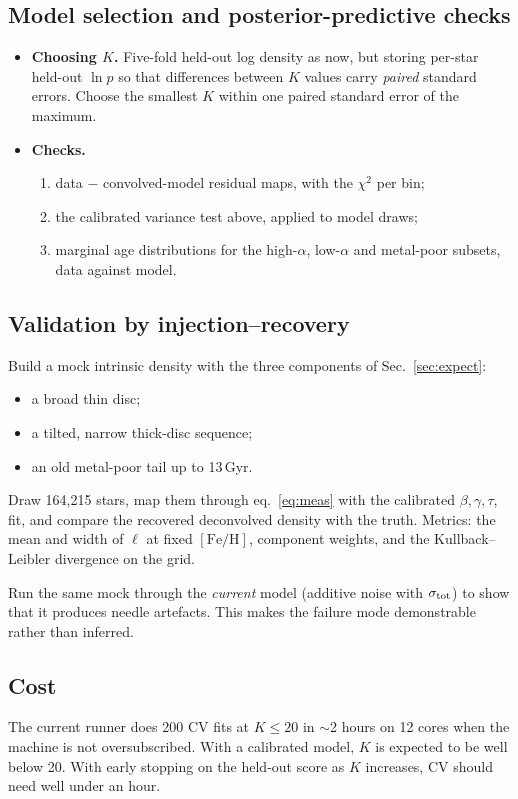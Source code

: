 \documentclass[11pt,a4paper]{article}
\newcommand{\feh}{\ensuremath{[\mathrm{Fe/H}]}}
\begin{document}
\subsection{Model selection and posterior-predictive checks}
\label{sec:selection}
\begin{itemize}
  \item \textbf{Choosing $K$.} Five-fold held-out log density as now, but storing per-star held-out $\ln p$ so that differences between $K$ values carry \emph{paired} standard errors. Choose the smallest $K$ within one paired standard error of the maximum.
  \item \textbf{Checks.}
  \begin{enumerate}
    \item data $-$ convolved-model residual maps, with the $\chi^2$ per bin;
    \item the calibrated variance test above, applied to model draws;
    \item marginal age distributions for the high-$\alpha$, low-$\alpha$ and metal-poor subsets, data against model.
  \end{enumerate}
\end{itemize}

\subsection{Validation by injection--recovery}
Build a mock intrinsic density with the three components of Sec.~\ref{sec:expect}:
\begin{itemize}
  \item a broad thin disc;
  \item a tilted, narrow thick-disc sequence;
  \item an old metal-poor tail up to 13\,Gyr.
\end{itemize}
Draw 164{,}215 stars, map them through eq.~\eqref{eq:meas} with the calibrated $\beta,\gamma,\tau$, fit, and compare the recovered deconvolved density with the truth. Metrics: the mean and width of $\ell$ at fixed \feh{}, component weights, and the Kullback--Leibler divergence on the grid.

Run the same mock through the \emph{current} model (additive noise with $\sigma_{\rm tot}$) to show that it produces needle artefacts. This makes the failure mode demonstrable rather than inferred.

\subsection{Cost}
The current runner does 200 CV fits at $K\le20$ in $\sim$2 hours on 12 cores when the machine is not oversubscribed. With a calibrated model, $K$ is expected to be well below 20. With early stopping on the held-out score as $K$ increases, CV should need well under an hour.
\end{document}
